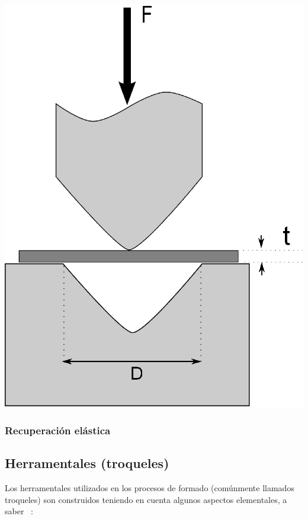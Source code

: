 \begin{center}
\includegraphics[scale=0.4]{src/ch2/fuerza_doblado.eps}
\label{fig:fuerza_doblado}
\end{center}


\subsubsection{Recuperación elástica}




\subsection{Herramentales (troqueles)}

Los herramentales utilizados en los procesos de formado (comúnmente llamados troqueles) son 
construidos teniendo en cuenta algunos aspectos elementales, a saber ~\cite{marin2009}:

